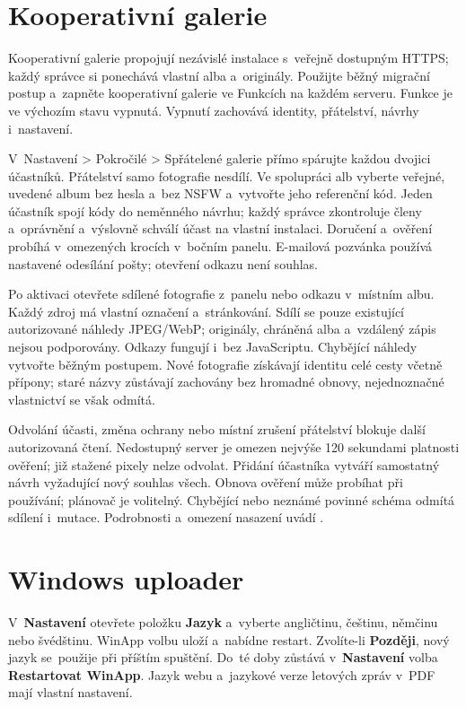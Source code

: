 \documentclass[11pt,a4paper]{article}
\newcommand{\filepath}[1]{\path{#1}}
\newcommand{\ui}[1]{\textbf{#1}}
\begin{document}
\section{Kooperativní galerie}
Kooperativní galerie propojují nezávislé instalace s~veřejně dostupným HTTPS;
každý správce si ponechává vlastní alba a~originály. Použijte běžný migrační
postup a~zapněte kooperativní galerie ve Funkcích na každém serveru. Funkce je
ve výchozím stavu vypnutá. Vypnutí zachovává identity, přátelství, návrhy
i~nastavení.

V~Nastavení > Pokročilé > Spřátelené galerie přímo spárujte každou dvojici
účastníků. Přátelství samo fotografie nesdílí. Ve spolupráci alb vyberte
veřejné, uvedené album bez hesla a~bez NSFW a~vytvořte jeho referenční kód.
Jeden účastník spojí kódy do neměnného návrhu; každý správce zkontroluje členy
a~oprávnění a~výslovně schválí účast na vlastní instalaci. Doručení a~ověření
probíhá v~omezených krocích v~bočním panelu. E-mailová pozvánka používá
nastavené odesílání pošty; otevření odkazu není souhlas.

Po aktivaci otevřete sdílené fotografie z~panelu nebo odkazu v~místním albu.
Každý zdroj má vlastní označení a~stránkování. Sdílí se pouze existující
autorizované náhledy JPEG/WebP; originály, chráněná alba a~vzdálený zápis nejsou
podporovány. Odkazy fungují i~bez JavaScriptu. Chybějící náhledy vytvořte běžným
postupem. Nové fotografie získávají identitu celé cesty včetně přípony; staré
názvy zůstávají zachovány bez hromadné obnovy, nejednoznačné vlastnictví se však
odmítá.

Odvolání účasti, změna ochrany nebo místní zrušení přátelství blokuje další
autorizovaná čtení. Nedostupný server je omezen nejvýše 120 sekundami platnosti
ověření; již stažené pixely nelze odvolat. Přidání účastníka vytváří samostatný
návrh vyžadující nový souhlas všech. Obnova ověření může probíhat při používání;
plánovač je volitelný. Chybějící nebo neznámé povinné schéma odmítá sdílení
i~mutace. Podrobnosti a~omezení nasazení uvádí
\filepath{docs/COOPERATIVE_GALLERIES.md}.

\section{Windows uploader}
V~\ui{Nastavení} otevřete položku \ui{Jazyk} a~vyberte angličtinu,
češtinu, němčinu nebo švédštinu. WinApp volbu uloží a~nabídne restart.
Zvolíte-li \ui{Později}, nový jazyk se~použije při příštím spuštění.
Do~té doby zůstává v~\ui{Nastavení} volba \ui{Restartovat WinApp}.
Jazyk webu a~jazykové verze letových zpráv v~PDF mají vlastní nastavení.
\end{document}
